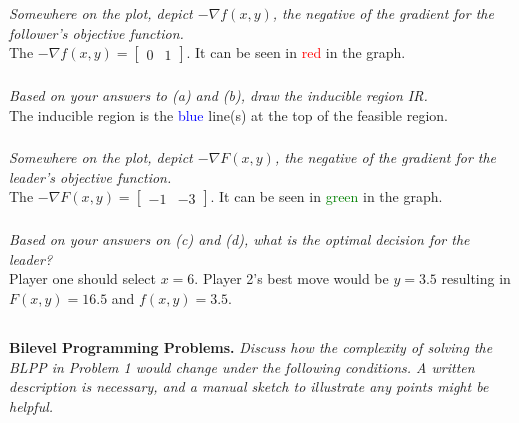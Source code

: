 \documentclass[12pt]{amsart}
\begin{document}
\subsubsection{}
\textit{Somewhere on the plot, depict $-\nabla f(x,y)$, the negative of the gradient for the follower’s objective function.} \\

	The $-\nabla f(x,y) = \begin{bmatrix} 0 & 1 \end{bmatrix}$. It can be seen in \textcolor{red}{red} in the graph.

\subsubsection{}
\textit{Based on your answers to (a) and (b), draw the inducible region IR.} \\
	
	The inducible region is the \textcolor{blue}{blue} line(s) at the top of the feasible region.
		
\subsubsection{}
\textit{Somewhere on the plot, depict $-\nabla F(x,y)$, the negative of the gradient for the leader’s objective function.} \\
	
	The $-\nabla F(x,y) = \begin{bmatrix} -1 & -3 \end{bmatrix}$. It can be seen in \textcolor{green}{green} in the graph.
	
\subsubsection{}
\textit{Based on your answers on (c) and (d), what is the optimal decision for the leader?} \\

	Player one should select $x=6$. Player 2's best move would be $y=3.5$ resulting in $F(x,y) = 16.5$ and $f(x,y) = 3.5$. 
	
\clearpage

\subsection{}
\textbf{Bilevel Programming Problems.} 
\textit{Discuss how the complexity of solving the BLPP in Problem 1 would change under the following conditions. A written description is necessary, and a manual sketch to illustrate any points might be helpful.}
\end{document}
